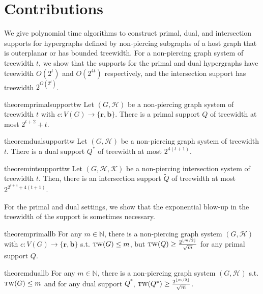\documentclass[12pt]{article}
\newcommand{\R}{\mathbf{r}}
\newcommand{\B}{\mathbf{b}}
\newcommand{\tw}{\textsc{tw}}
\theoremstyle{case}
\begin{document}
\section{Contributions}\label{sec:contributions}
We give polynomial time algorithms to construct primal, dual, and intersection supports for hypergraphs defined by non-piercing subgraphs of a host graph that is outerplanar or has bounded treewidth.
For a non-piercing graph system of treewidth $t$, 
we show that the supports for the primal and dual hypergraphs have treewidth $O(2^t)$ and $O(2^{4t})$ respectively, and
the intersection support has treewidth $2^{O(2^{t})}$.


\begin{restatable}{theorem}{primalsupporttw}
\label{thm:primalsupporttw}
Let $(G,\mathcal{H})$ be a non-piercing graph system of 
treewidth $t$ with $c:V(G)\to\{\R,\B\}$.
There
is a primal support $Q$ of treewidth  at most $2^{t+2}+t$.
\end{restatable}

\begin{restatable}{theorem}{dualsupporttw}
\label{thm:dualsupporttw}
Let $(G,\mathcal{H})$ be a non-piercing graph system of treewidth $t$. There is a dual support $Q^*$
of treewidth at most $2^{4(t+1)}$.
\end{restatable}

\begin{restatable}{theorem}{intsupporttw}
\label{thm:intsupporttw}
Let $(G,\mathcal{H,K})$ be a non-piercing intersection system of treewidth $t$.
Then, there is an intersection support $\tilde{Q}$ 
of treewidth at most $2^{2^{t+4}+4(t+1)}$. 
\end{restatable}

For the primal and dual settings, we show that the exponential blow-up in the treewidth of the support is sometimes
necessary.

\begin{restatable}{theorem}{primallb}
\label{thm:primallb}
For any $m\in\mathbb{N}$,
there is a non-piercing graph system $(G,\mathcal{H})$ 
with $c:V(G)\to\{\R,\B\}$ s.t. $\tw(G)\le m$, but
$\tw(Q)\ge \frac{2^{\lfloor m/2\rfloor}}{\sqrt{m}}$ for any primal support $Q$.
\end{restatable}

\begin{restatable}{theorem}{duallb}
\label{thm:dualtwlb}
For any $m\in\mathbb{N}$,
there is a non-piercing graph system $(G,\mathcal{H})$
s.t. $\tw(G)\le m$ and for any dual support $Q^*$,
$\tw(Q^*)\ge \frac{2^{\lfloor m/2\rfloor}}{\sqrt{m}}$.   
\end{restatable}
\end{document}
